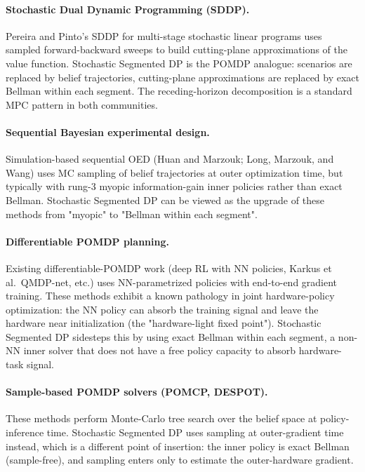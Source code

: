 \documentclass[11pt,a4paper]{article}
\begin{document}
\paragraph{Stochastic Dual Dynamic Programming (SDDP).}  Pereira and Pinto's SDDP for
multi-stage stochastic linear programs uses sampled forward-backward sweeps to build
cutting-plane approximations of the value function.  Stochastic Segmented DP is the POMDP
analogue: scenarios are replaced by belief trajectories, cutting-plane approximations are
replaced by exact Bellman within each segment.  The receding-horizon decomposition is a
standard MPC pattern in both communities.

\paragraph{Sequential Bayesian experimental design.}  Simulation-based sequential OED
(Huan and Marzouk; Long, Marzouk, and Wang) uses MC sampling of belief trajectories at
outer optimization time, but typically with rung-3 myopic information-gain inner policies
rather than exact Bellman.  Stochastic Segmented DP can be viewed as the upgrade of these
methods from "myopic" to "Bellman within each segment".

\paragraph{Differentiable POMDP planning.}  Existing differentiable-POMDP work (deep RL
with NN policies, Karkus et al.\ QMDP-net, etc.) uses NN-parametrized policies with
end-to-end gradient training.  These methods exhibit a known pathology in joint
hardware-policy optimization: the NN policy can absorb the training signal and leave the
hardware near initialization (the "hardware-light fixed point").  Stochastic Segmented DP
sidesteps this by using exact Bellman within each segment, a non-NN inner solver that does
not have a free policy capacity to absorb hardware-task signal.

\paragraph{Sample-based POMDP solvers (POMCP, DESPOT).}  These methods perform Monte-Carlo
tree search over the belief space at policy-inference time.  Stochastic Segmented DP uses
sampling at outer-gradient time instead, which is a different point of insertion: the
inner policy is exact Bellman (sample-free), and sampling enters only to estimate the
outer-hardware gradient.
\end{document}
